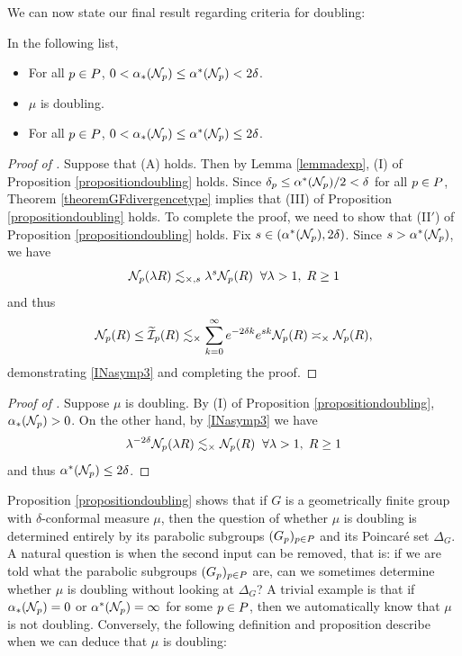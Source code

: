 We can now state our final result regarding criteria for doubling:

\begin{proposition}
\label{propositiondoubling2}
In the following list, 
\begin{itemize}
\item[(A)] For all $p\in P$, $0 < \alpha_*(\mathcal N_p) \leq \alpha^*(\mathcal N_p) < 2\delta$.
\item[(B)] $\mu$ is doubling.
\item[(C)] For all $p\in P$, $0 < \alpha_*(\mathcal N_p) \leq \alpha^*(\mathcal N_p) \leq 2\delta$.
\end{itemize}
\end{proposition}
\begin{proof}[Proof of ]
Suppose that (A) holds. Then by Lemma \ref{lemmadexp}, (I) of Proposition \ref{propositiondoubling} holds. Since $\delta_p \leq \alpha^*(\mathcal N_p)/2 < \delta$ for all $p\in P$, Theorem \ref{theoremGFdivergencetype} implies that (III) of Proposition \ref{propositiondoubling} holds. To complete the proof, we need to show that (II$'$) of Proposition \ref{propositiondoubling} holds. Fix $s\in (\alpha^*(\mathcal N_p),2\delta)$. Since $s > \alpha^*(\mathcal N_p)$, we have
\[
\mathcal N_p(\lambda R) \lesssim_{\times,s} \lambda^s \mathcal N_p(R) \;\;\forall \lambda > 1,\; R\geq 1
\]
and thus
\[
\mathcal N_p(R) \leq \widetilde{\mathcal I}_p(R) \lesssim_\times \sum_{k = 0}^\infty e^{-2\delta k} e^{sk} \mathcal N_p(R) \asymp_\times \mathcal N_p(R),
\]
demonstrating \eqref{INasymp3} and completing the proof.
\end{proof}
\begin{proof}[Proof of ]
Suppose $\mu$ is doubling. By (I) of Proposition \ref{propositiondoubling}, $\alpha_*(\mathcal N_p) > 0$. On the other hand, by \eqref{INasymp3} we have
\[
\lambda^{-2\delta} \mathcal N_p(\lambda R) \lesssim_\times \mathcal N_p(R) \;\;\forall \lambda > 1,\; R\geq 1
\]
and thus $\alpha^*(\mathcal N_p) \leq 2\delta$.
\end{proof}

Proposition \ref{propositiondoubling} shows that if $G$ is a geometrically finite group with $\delta$-conformal measure $\mu$, then the question of whether $\mu$ is doubling is determined entirely by its parabolic subgroups $(G_p)_{p\in P}$ and its Poincar\'e set $\Delta_G$. A natural question is when the second input can be removed, that is: if we are told what the parabolic subgroups $(G_p)_{p\in P}$ are, can we sometimes determine whether $\mu$ is doubling without looking at $\Delta_G$? A trivial example is that if $\alpha_*(\mathcal N_p) = 0$ or $\alpha^*(\mathcal N_p) = \infty$ for some $p\in P$, then we automatically know that $\mu$ is not doubling. Conversely, the following definition and proposition describe when we can deduce that $\mu$ is doubling:

